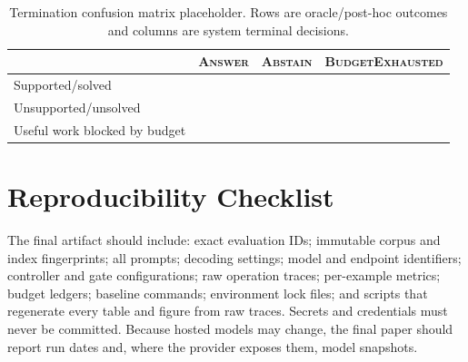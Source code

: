 \begin{table}[h]
\caption{Termination confusion matrix placeholder. Rows are oracle/post-hoc outcomes and columns are system terminal decisions.}
\centering
\begin{tabular}{lrrr}
\toprule
 & \textsc{Answer} & \textsc{Abstain} & \textsc{BudgetExhausted} \\
\midrule
Supported/solved & \tbd{ } & \tbd{ } & \tbd{ } \\
Unsupported/unsolved & \tbd{ } & \tbd{ } & \tbd{ } \\
Useful work blocked by budget & \tbd{ } & \tbd{ } & \tbd{ } \\
\bottomrule
\end{tabular}
\end{table}

\section{Reproducibility Checklist}

The final artifact should include: exact evaluation IDs; immutable corpus and index fingerprints; all prompts; decoding settings; model and endpoint identifiers; controller and gate configurations; raw operation traces; per-example metrics; budget ledgers; baseline commands; environment lock files; and scripts that regenerate every table and figure from raw traces. Secrets and credentials must never be committed. Because hosted models may change, the final paper should report run dates and, where the provider exposes them, model snapshots.
